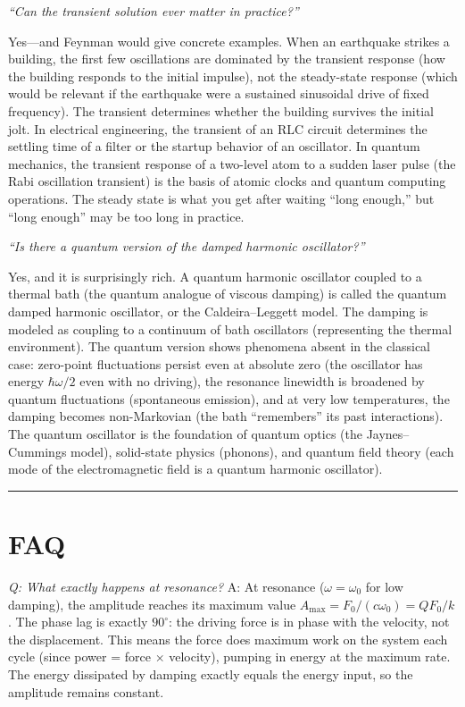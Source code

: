\documentclass[11pt,openright]{book}
\begin{document}
\textit{``Can the transient solution ever matter in practice?''}

Yes---and Feynman would give concrete examples. When an earthquake strikes a building, the first few oscillations are dominated by the transient response (how the building responds to the initial impulse), not the steady-state response (which would be relevant if the earthquake were a sustained sinusoidal drive of fixed frequency). The transient determines whether the building survives the initial jolt. In electrical engineering, the transient of an RLC circuit determines the settling time of a filter or the startup behavior of an oscillator. In quantum mechanics, the transient response of a two-level atom to a sudden laser pulse (the Rabi oscillation transient) is the basis of atomic clocks and quantum computing operations. The steady state is what you get after waiting ``long enough,'' but ``long enough'' may be too long in practice.

\textit{``Is there a quantum version of the damped harmonic oscillator?''}

Yes, and it is surprisingly rich. A quantum harmonic oscillator coupled to a thermal bath (the quantum analogue of viscous damping) is called the quantum damped harmonic oscillator, or the Caldeira--Leggett model. The damping is modeled as coupling to a continuum of bath oscillators (representing the thermal environment). The quantum version shows phenomena absent in the classical case: zero-point fluctuations persist even at absolute zero (the oscillator has energy $\hbar\omega/2$ even with no driving), the resonance linewidth is broadened by quantum fluctuations (spontaneous emission), and at very low temperatures, the damping becomes non-Markovian (the bath ``remembers'' its past interactions). The quantum oscillator is the foundation of quantum optics (the Jaynes--Cummings model), solid-state physics (phonons), and quantum field theory (each mode of the electromagnetic field is a quantum harmonic oscillator).

\bigskip
\hrule
\bigskip
\section*{FAQ}

\textit{Q: What exactly happens at resonance?}
A: At resonance ($\omega = \omega_0$ for low damping), the amplitude reaches its maximum value $A_{\text{max}} = F_0/(c\omega_0) = QF_0/k$. The phase lag is exactly $90^\circ$: the driving force is in phase with the velocity, not the displacement. This means the force does maximum work on the system each cycle (since power = force $\times$ velocity), pumping in energy at the maximum rate. The energy dissipated by damping exactly equals the energy input, so the amplitude remains constant.
\end{document}
